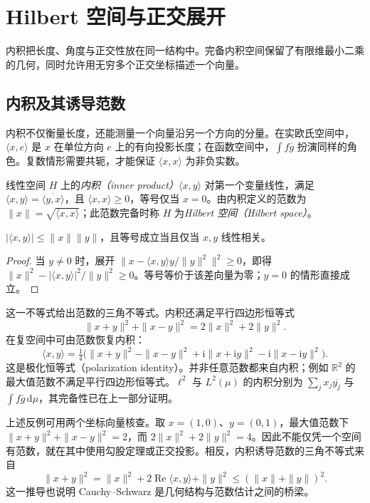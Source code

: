 \setcounter{chapter}{4} %
\chapter{Hilbert 空间与正交展开}
\label{chap:fa-hilbert}

内积把长度、角度与正交性放在同一结构中。完备内积空间保留了有限维最小二乘的几何，同时允许用无穷多个正交坐标描述一个向量。

\section{内积及其诱导范数}
内积不仅衡量长度，还能测量一个向量沿另一个方向的分量。在实欧氏空间中，$\langle x,e\rangle$ 是 $x$ 在单位方向 $e$ 上的有向投影长度；在函数空间中，$\int f\overline g$ 扮演同样的角色。复数情形需要共轭，才能保证 $\langle x,x\rangle$ 为非负实数。

\begin{definition}
线性空间 $H$ 上的\emph{内积（inner product）}$\langle x,y\rangle$ 对第一个变量线性，满足 $\langle x,y\rangle=\overline{\langle y,x\rangle}$，且 $\langle x,x\rangle\geq0$，等号仅当 $x=0$。由内积定义的范数为 $\|x\|=\sqrt{\langle x,x\rangle}$；此范数完备时称 $H$ 为\emph{Hilbert 空间（Hilbert space）}。
\end{definition}
\begin{proposition}
$|\langle x,y\rangle|\leq\|x\|\|y\|$，且等号成立当且仅当 $x,y$ 线性相关。
\end{proposition}
\begin{proof}
当 $y\ne0$ 时，展开 $\|x-\langle x,y\rangle y/\|y\|^2\|^2\geq0$，即得 $\|x\|^2-|\langle x,y\rangle|^2/\|y\|^2\geq0$。等号等价于该差向量为零；$y=0$ 的情形直接成立。
\end{proof}
这一不等式给出范数的三角不等式。内积还满足平行四边形恒等式
\[
 \|x+y\|^2+\|x-y\|^2=2\|x\|^2+2\|y\|^2.
\]
在复空间中可由范数恢复内积：
\[
 \langle x,y\rangle=\tfrac14\bigl(\|x+y\|^2-\|x-y\|^2
 +\mathrm i\|x+\mathrm iy\|^2-\mathrm i\|x-\mathrm iy\|^2\bigr).
\]
这是极化恒等式（polarization identity）。并非任意范数都来自内积；例如 $\mathbb R^2$ 的最大值范数不满足平行四边形恒等式。$\ell^2$ 与 $L^2(\mu)$ 的内积分别为 $\sum_jx_j\overline{y_j}$ 与 $\int f\overline g\,\mathrm d\mu$，其完备性已在上一部分证明。

上述反例可用两个坐标向量核查。取 $x=(1,0)$、$y=(0,1)$，最大值范数下 $\|x+y\|^2+\|x-y\|^2=2$，而 $2\|x\|^2+2\|y\|^2=4$。因此不能仅凭一个空间有范数，就在其中使用勾股定理或正交投影。相反，内积诱导范数的三角不等式来自
\[
 \|x+y\|^2=\|x\|^2+2\operatorname{Re}\langle x,y\rangle+\|y\|^2
 \leq(\|x\|+\|y\|)^2.
\]
这一推导也说明 Cauchy--Schwarz 是几何结构与范数估计之间的桥梁。

